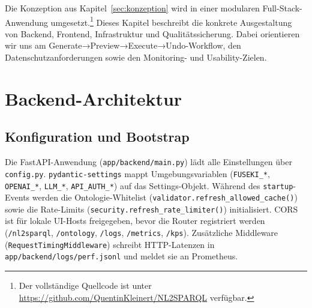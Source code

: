 Die Konzeption aus Kapitel~\ref{sec:konzeption} wird in einer modularen Full-Stack-Anwendung umgesetzt.\footnote{Der vollständige Quellcode ist unter \url{https://github.com/QuentinKleinert/NL2SPARQL} verfügbar.} Dieses Kapitel beschreibt die konkrete Ausgestaltung von Backend, Frontend, Infrastruktur und Qualitätssicherung. Dabei orientieren wir uns am Generate→Preview→Execute→Undo-Workflow, den Datenschutzanforderungen sowie den Monitoring- und Usability-Zielen.

\section{Backend-Architektur}

\subsection{Konfiguration und Bootstrap}
Die FastAPI-Anwendung (\texttt{app/backend/main.py}) lädt alle Einstellungen über \texttt{config.py}. \texttt{pydantic-settings} mappt Umgebungsvariablen (\texttt{FUSEKI\_*}, \texttt{OPENAI\_*}, \texttt{LLM\_*}, \texttt{API\_AUTH\_*}) auf das Settings-Objekt. Während des \texttt{startup}-Events werden die Ontologie-Whitelist (\texttt{validator.refresh\_allowed\_cache()}) sowie die Rate-Limits (\texttt{security.refresh\_rate\_limiter()}) initialisiert. CORS ist für lokale UI-Hosts freigegeben, bevor die Router registriert werden (\texttt{/nl2sparql}, \texttt{/ontology}, \texttt{/logs}, \texttt{/metrics}, \texttt{/kps}). Zusätzliche Middleware (\texttt{RequestTimingMiddleware}) schreibt HTTP-Latenzen in \texttt{app/backend/logs/perf.jsonl} und meldet sie an Prometheus.

